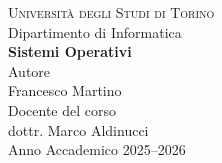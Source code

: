 \documentclass[12pt,a4paper, openany]{book}
\begin{document}
	\begin{titlepage}
		\centering
		
		{\Large \textsc{Università degli Studi di Torino}}\\[0.5cm]
		{\large Dipartimento di Informatica}\\[3cm]
		
		{\Huge \bfseries Sistemi Operativi}\\[0.5cm]
		
		{\large Autore}\\
		{\Large Francesco Martino}\\[1.5cm]
		
		{\large Docente del corso}\\
		{\Large dottr. Marco Aldinucci}\\[3cm]
		
		{\large Anno Accademico 2025--2026}
		
		\vfill
		
	\end{titlepage}\
	
\end{document}
